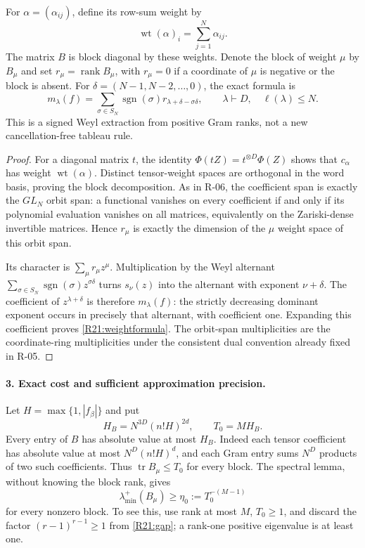 \documentclass[11pt,a4paper]{article}
\theoremstyle{definition}\newtheorem{definition}{Definition}
\begin{document}
For $\alpha=(\alpha_{ij})$, define its row-sum weight by
\[
 \operatorname{wt}(\alpha)_i=\sum_{j=1}^N\alpha_{ij}.
\]
The matrix $B$ is block diagonal by these weights. Denote the block
of weight $\mu$ by $B_\mu$ and set $r_\mu=\operatorname{rank}B_\mu$,
with $r_\mu=0$ if a coordinate of $\mu$ is negative or the block is
absent. For $\delta=(N-1,N-2,\ldots,0)$, the exact formula is
\begin{equation}\label{R21:weightformula}
 m_\lambda(f)=
 \sum_{\sigma\in S_N}\operatorname{sgn}(\sigma)
              r_{\lambda+\delta-\sigma\delta},
 \qquad \lambda\vdash D,\quad\ell(\lambda)\leq N.
\end{equation}
This is a signed Weyl extraction from positive Gram ranks, not a new
cancellation-free tableau rule.

\begin{proof}
For a diagonal matrix $t$, the identity
$\Phi(tZ)=t^{\otimes D}\Phi(Z)$ shows that $c_\alpha$ has weight
$\operatorname{wt}(\alpha)$. Distinct tensor-weight spaces are
orthogonal in the word basis, proving the block decomposition.
As in R-06, the coefficient span is exactly the $GL_N$ orbit span:
a functional vanishes on every coefficient if and only if its
polynomial evaluation vanishes on all matrices, equivalently on the
Zariski-dense invertible matrices. Hence $r_\mu$ is exactly the
dimension of the $\mu$ weight space of this orbit span.

Its character is $\sum_\mu r_\mu z^\mu$.
Multiplication by the Weyl alternant
$\sum_{\sigma\in S_N}\operatorname{sgn}(\sigma)z^{\sigma\delta}$
turns $s_\nu(z)$ into the alternant with exponent $\nu+\delta$.
The coefficient of $z^{\lambda+\delta}$ is therefore $m_\lambda(f)$:
the strictly decreasing dominant exponent occurs in precisely that
alternant, with coefficient one. Expanding this coefficient proves
\eqref{R21:weightformula}. The orbit-span multiplicities are the
coordinate-ring multiplicities under the consistent dual convention
already fixed in R-05.
\end{proof}

\paragraph{3. Exact cost and sufficient approximation precision.}
Let $H=\max\{1,|f_\beta|\}$ and put
\[
 H_B=N^{3D}(n!H)^{2d},\qquad T_0=MH_B.
\]
Every entry of $B$ has absolute value at most $H_B$.
Indeed each tensor coefficient has absolute value at most
$N^D(n!H)^d$, and each Gram entry sums $N^D$ products of two such
coefficients. Thus $\operatorname{tr}B_\mu\leq T_0$ for every block.
The spectral lemma, without knowing the block rank, gives
\begin{equation}\label{R21:uniformgap}
 \lambda_{\min}^{+}(B_\mu)\geq
 \eta_0:=T_0^{-(M-1)}
\end{equation}
for every nonzero block. To see this, use rank at most $M$,
$T_0\geq1$, and discard the factor $(r-1)^{r-1}\geq1$ from
\eqref{R21:gap}; a rank-one positive eigenvalue is at least one.
\end{document}
